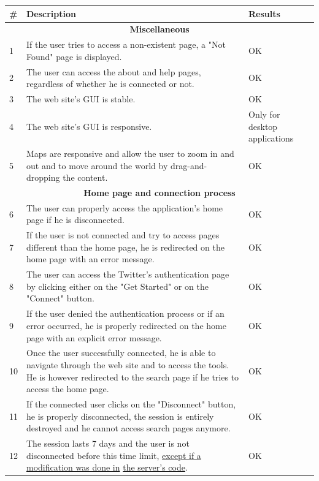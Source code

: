 \documentclass[a4paper,11pt]{report}
\begin{document}
\begin{center}
\def\arraystretch{1.5}
\begin{longtable}{|l|p{10cm}|p{4.4cm}|}\hline
	\textbf{\#} & \textbf{Description} & \textbf{Results}\\\hline \endhead
	\multicolumn{3}{|c|}{\textbf{Miscellaneous}}\\\hline
	1 & If the user tries to access a non-existent page, a "Not Found" page is displayed. & \color{ForestGreen}OK\color{black}\\\hline
	2 & The user can access the about and help pages, regardless of whether he is connected or not. & \color{ForestGreen}OK\color{black}\\\hline
	3 & The web site's GUI is stable. & \color{ForestGreen}OK\color{black}\\\hline
	4 & The web site's GUI is responsive. & \color{Orange}Only for desktop applications\color{black}\\\hline	
	5 & Maps are responsive and allow the user to zoom in and out and to move around the world by drag-and-dropping the content. & \color{ForestGreen}OK\color{black}\\\hline
	
	\multicolumn{3}{|c|}{\textbf{Home page and connection process}}\\\hline
	6 & The user can properly access the application's home page if he is disconnected. & \color{ForestGreen}OK\color{black}\\\hline
	7 & If the user is not connected and try to access pages different than the home page, he is redirected on the home page with an error message. & \color{ForestGreen}OK\color{black}\\\hline
	8 & The user can access the Twitter's authentication page by clicking either on the "Get Started" or on the "Connect" button. & \color{ForestGreen}OK\color{black}\\\hline
	9 & If the user denied the authentication process or if an error occurred, he is properly redirected on the home page with an explicit error message. & \color{ForestGreen}OK\color{black}\\\hline
	10 & Once the user successfully connected, he is able to navigate through the web site and to access the tools. He is however redirected to the search page if he tries to access the home page. & \color{ForestGreen}OK\color{black}\\\hline
	11 & If the connected user clicks on the "Disconnect" button, he is properly disconnected, the session is entirely destroyed and he cannot access search pages anymore. & \color{ForestGreen}OK\color{black}\\\hline
	12 & The session lasts 7 days and the user is not disconnected before this time limit, \underline{except if a modification was done in} \underline{the server's code}. & \color{ForestGreen}OK\color{black}\\\hline
	

\end{longtable}
\end{center}
\end{document}
